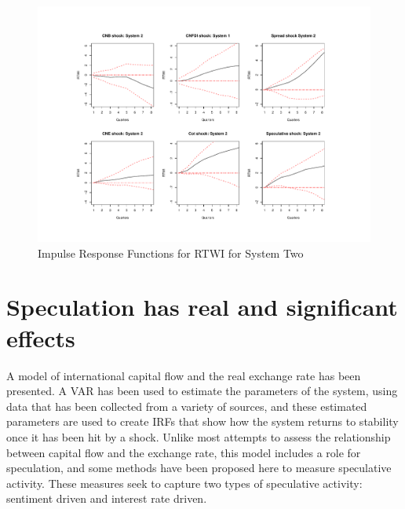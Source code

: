 \documentclass[12pt, a4paper, oneside]{article}\usepackage[]{graphicx}\usepackage[]{color}
\begin{document}
\begin{landscape}
\begin{figure}[t]
\graphicspath{{Pictures/C2/}}
\centering
\caption{Impulse Response Functions for RTWI for System Two}
\label{fig:IRF3}
\includegraphics[scale=0.8]{IRF2}
\end{figure}
\end{landscape} 


\section{Speculation has real and significant effects} 
A model of international capital flow and the real exchange rate has been presented.  A VAR has been used to estimate the parameters of the system, using data that has been collected from a variety of sources, and these estimated parameters are used to create IRFs that show how the system returns to stability once it has been hit by a shock.  Unlike most attempts to assess the relationship between capital flow and the exchange rate, this model includes a role for speculation, and some methods have been proposed here to measure speculative activity.  These measures seek to capture two types of speculative activity:  sentiment driven and interest rate driven.  
\end{document}

